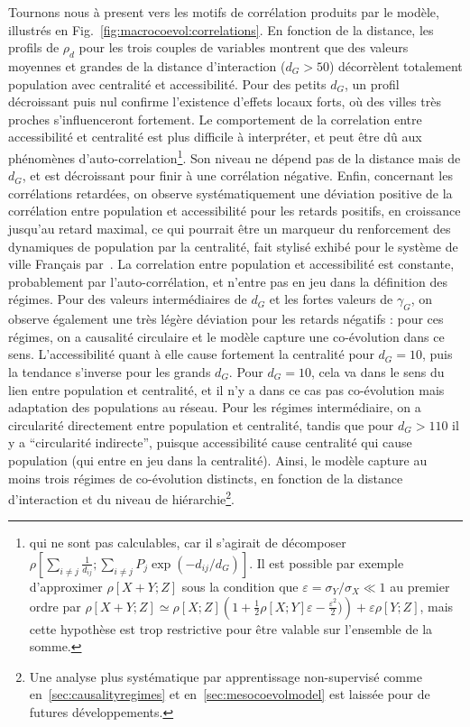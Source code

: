 Tournons nous à present vers les motifs de corrélation produits par le modèle, illustrés en Fig.~\ref{fig:macrocoevol:correlations}. En fonction de la distance, les profils de $\rho_d$ pour les trois couples de variables montrent que des valeurs moyennes et grandes de la distance d'interaction ($d_G > 50$) décorrèlent totalement population avec centralité et accessibilité. Pour des petits $d_G$, un profil décroissant puis nul confirme l'existence d'effets locaux forts, où des villes très proches s'influenceront fortement. Le comportement de la correlation entre accessibilité et centralité est plus difficile à interpréter, et peut être dû aux phénomènes d'auto-correlation\footnote{qui ne sont pas calculables, car il s'agirait de décomposer $\rho\left[\sum_{i\neq j} \frac{1}{d_{ij}}; \sum_{i\neq j} P_j \exp{\left(-d_{ij}/d_G\right)}\right]$. Il est possible par exemple d'approximer $\rho\left[X+Y;Z\right]$ sous la condition que $\varepsilon = \sigma_Y / \sigma_X \ll 1$ au premier ordre par $\rho\left[ X+Y;Z \right] \simeq \rho\left[ X;Z \right]\left(1+\frac{1}{2}\rho\left[X;Y\right]\varepsilon - \frac{\varepsilon^2}{2})\right) + \varepsilon \rho\left[Y;Z\right]$, mais cette hypothèse est trop restrictive pour être valable sur l'ensemble de la somme.}. Son niveau ne dépend pas de la distance mais de $d_G$, et est décroissant pour finir à une corrélation négative. Enfin, concernant les corrélations retardées, on observe systématiquement une déviation positive de la corrélation entre population et accessibilité pour les retards positifs, en croissance jusqu'au retard maximal, ce qui pourrait être un marqueur du renforcement des dynamiques de population par la centralité, fait stylisé exhibé pour le système de ville Français par~\cite{bretagnolle:tel-00459720}. La correlation entre population et accessibilité est constante, probablement par l'auto-corrélation, et n'entre pas en jeu dans la définition des régimes. Pour des valeurs intermédiaires de $d_G$ et les fortes valeurs de $\gamma_G$, on observe également une très légère déviation pour les retards négatifs : pour ces régimes, on a causalité circulaire et le modèle capture une co-évolution dans ce sens. L'accessibilité quant à elle cause fortement la centralité pour $d_G = 10$, puis la tendance s'inverse pour les grands $d_G$. Pour $d_G = 10$, cela va dans le sens du lien entre population et centralité, et il n'y a dans ce cas pas co-évolution mais adaptation des populations au réseau. Pour les régimes intermédiaire, on a circularité directement entre population et centralité, tandis que pour $d_G > 110$ il y a ``circularité indirecte'', puisque accessibilité cause centralité qui cause population (qui entre en jeu dans la centralité). Ainsi, le modèle capture au moins trois régimes de co-évolution distincts, en fonction de la distance d'interaction et du niveau de hiérarchie\footnote{Une analyse plus systématique par apprentissage non-supervisé comme en~\ref{sec:causalityregimes} et en~\ref{sec:mesocoevolmodel} est laissée pour de futures développements.}.


